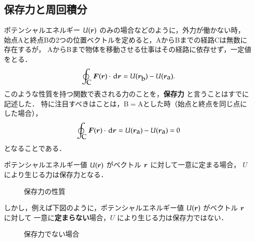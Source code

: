         \subsection{保存力と周回積分}\label{subsec:hozonryoku_to_shukaisekibun}
                        ポテンシャルエネルギー $U(\boldsymbol{r})$ のみの場合などのように，外力が働かない時，
                        始点Aと終点Bの2つの位置ベクトルを定めると，AからBまでの経路Cは無数に存在するが，
                        AからBまで物体を移動させる仕事はその経路に依存せず，一定値をとる．
                        \begin{equation*}
                                \oint_{\mbox{C}} \boldsymbol{F} (\boldsymbol{r}) \cdot \,\mathrm{d} \boldsymbol{r} = U(\boldsymbol{r}_{\mbox{b}}) - U(\boldsymbol{r}_{\mbox{a}}).
                        \end{equation*}
                        このような性質を持つ関数で表される力のことを，\textbf{保存力} と言うことはすでに記述した．
            特に注目すべきはことは，B$=$Aとした時（始点と終点を同じ点にした場合），
                        \begin{equation*}
                                \oint_{\mbox{C}} \boldsymbol{F} (\boldsymbol{r}) \cdot \,\mathrm{d} \boldsymbol{r} = U(\boldsymbol{r}_{\mbox{a}}) - U(\boldsymbol{r}_{\mbox{a}}) = 0
                        \end{equation*}
                        となることである．


                        ポテンシャルエネルギー値 $U(\boldsymbol{r})$ がベクトル $\boldsymbol{r}$ に対して一意に定まる場合，
                        $U$ により生じる力は保存力となる．
                    \begin{figure}[hbt]
                        \begin{center}
                            \caption{保存力の性質}
                            \label{fig:sensekibun_shukaisekibun_001}
                        \end{center}
                    \end{figure}


                        しかし，例えば下図のように，ポテンシャルエネルギー値 $U(\boldsymbol{r})$ がベクトル $\boldsymbol{r}$ に対して
                        一意に\textbf{定まらない}場合，$U$ により生じる力は保存力ではない．
                    \begin{figure}[hbt]
                        \begin{center}
                            \caption{保存力でない場合}
                            \label{fig:sensekibun_shukaisekibun_004}
                        \end{center}
                    \end{figure}

